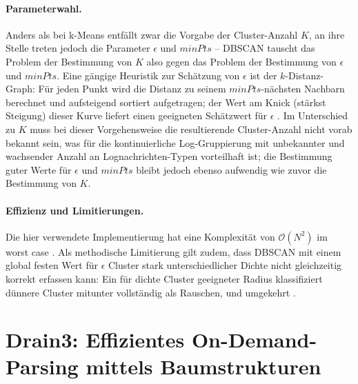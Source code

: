 \paragraph{Parameterwahl.}
Anders als bei k-Means entfällt zwar die Vorgabe der Cluster-Anzahl $K$, an ihre Stelle treten jedoch die Parameter $\epsilon$ und $\textit{minPts}$ -- DBSCAN tauscht das Problem der Bestimmung von $K$ also gegen das Problem der Bestimmung von $\epsilon$ und $\textit{minPts}$. Eine gängige Heuristik zur Schätzung von $\epsilon$ ist der $k$-Distanz-Graph\cite{DatacampDBSCAN}: Für jeden Punkt wird die Distanz zu seinem $\textit{minPts}$-nächsten Nachbarn berechnet und aufsteigend sortiert aufgetragen; der Wert am Knick (stärkst Steigung) dieser Kurve liefert einen geeigneten Schätzwert für $\epsilon$ \cite{Mohammed_Wagner_2020}. Im Unterschied zu $K$ muss bei dieser Vorgehensweise die resultierende Cluster-Anzahl nicht vorab bekannt sein, was für die kontinuierliche Log-Gruppierung mit unbekannter und wachsender Anzahl an Lognachrichten-Typen vorteilhaft ist; die Bestimmung guter Werte für $\epsilon$ und $\textit{minPts}$ bleibt jedoch ebenso aufwendig wie zuvor die Bestimmung von $K$.

\paragraph{Effizienz und Limitierungen.}
 Die hier verwendete Implementierung hat eine Komplexität von $\mathcal{O}(N^2)$ im worst case \cite{ScikitLearnDBSCAN}. 
 Als methodische Limitierung gilt zudem, dass DBSCAN mit einem global festen Wert für $\epsilon$ Cluster stark unterschiedlicher Dichte nicht gleichzeitig korrekt erfassen kann: Ein für dichte Cluster geeigneter Radius klassifiziert dünnere Cluster mitunter vollständig als Rauschen, und umgekehrt \cite{DatacampDBSCAN}.

\section{Drain3: Effizientes On-Demand-Parsing mittels Baumstrukturen}
\label{sec:drain3}


